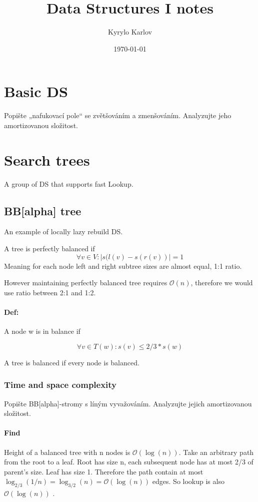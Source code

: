\documentclass[12pt]{article}
\title {Data Structures I notes}
\author {Kyrylo Karlov}
\date {\today}
\newcommand{\bigO}{\mathcal{O}}
\begin{document}
\maketitle
\tableofcontents

\pagebreak

\section{Basic DS}

Popište „nafukovací pole“ se zvětšováním a zmenšováním. Analyzujte jeho amortizovanou složitost.


\section{Search trees}
A group of DS that supports fast Lookup.


\subsection{BB[alpha] tree}
An example of locally lazy rebuild DS.

A tree is perfectly balanced if
\[ \forall v \in V : | s(l(v) - s(r(v)) | = 1 \]
Meaning for each node left and right subtree sizes are almost equal, 1:1 ratio.

However maintaining perfectly balanced tree requires $ \bigO(n) $, therefore we would use ratio between 2:1 and 1:2.
\paragraph{Def:} A node w is in balance if

\[ \forall v \in T(w) : s(v) \leq 2/3 * s(w) \]

A tree is balanced if every node is balanced.

\subsubsection{Time and space complexity}
Popište BB[alpha]-stromy s líným vyvažováním. Analyzujte jejich amortizovanou složitost.

\paragraph{Find} Height of a balanced tree with n nodes is $ \bigO(\log(n)) $.
Take an arbitrary path from the root to a leaf. Root has size n, each subsequent node has at most 2/3 of parent's size. Leaf has size 1. Therefore the path contain at most $ \log_{2/3} (1/n) = \log_{3/2}(n) = \bigO(\log(n)) $ edges. So lookup is also $ \bigO(\log(n)) $ .
\end{document}
